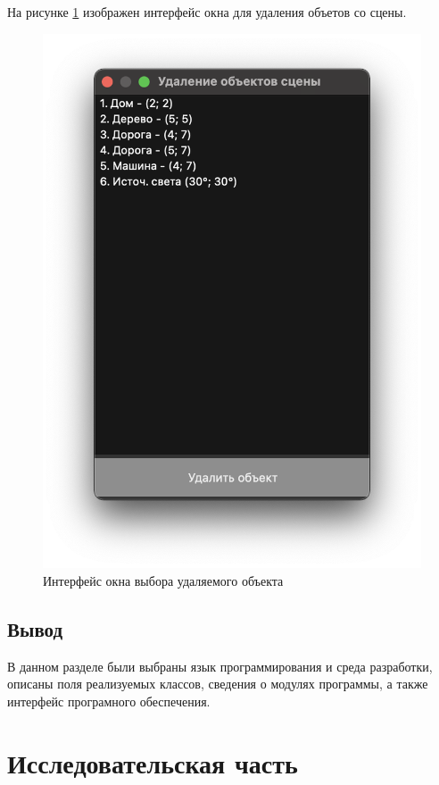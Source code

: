 \documentclass[a4paper,14pt, unknownkeysallowed]{extreport}
\begin{document}
\clearpage

На рисунке \ref{fig:deletion} изображен интерфейс окна для удаления объетов со сцены. 

\begin{figure}[h]
	\centering
	\includegraphics[scale=0.6]{img/deletion.png}
	\caption{Интерфейс окна выбора удаляемого объекта}
	\label{fig:deletion}
\end{figure} 

\section{Вывод}

В данном разделе были выбраны язык программирования и среда разработки, описаны поля реализуемых классов, сведения о модулях программы, а также интерфейс програмного обеспечения.

\chapter{Исследовательская часть}
\end{document}
